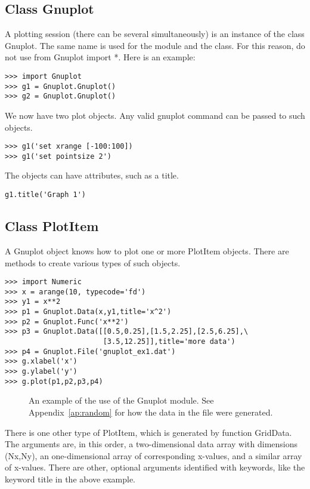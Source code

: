 \documentclass{article}
\begin{document}
\subsection{Class {\ttfamily Gnuplot}}

A plotting session (there can be several simultaneously) is an instance of the
class {\ttfamily Gnuplot}.  The same name is used for the module and the class.
For this reason, do not use {\ttfamily from Gnuplot import *}.
Here is an example:
\begin{verbatim}
>>> import Gnuplot
>>> g1 = Gnuplot.Gnuplot()
>>> g2 = Gnuplot.Gnuplot()
\end{verbatim}
We now have two plot objects.  Any valid {\ttfamily gnuplot} command can be passed
to such objects.
\begin{verbatim}
>>> g1('set xrange [-100:100])
>>> g1('set pointsize 2')
\end{verbatim}
The objects can have attributes, such as a title.
\begin{verbatim}
g1.title('Graph 1')
\end{verbatim}

\subsection{Class {\ttfamily PlotItem}}

A {\ttfamily Gnuplot} object knows how to plot one or more
{\ttfamily PlotItem} objects.
There are methods to create various types of such objects.
\begin{verbatim}
>>> import Numeric
>>> x = arange(10, typecode='fd')
>>> y1 = x**2
>>> p1 = Gnuplot.Data(x,y1,title='x^2')
>>> p2 = Gnuplot.Func('x**2')
>>> p3 = Gnuplot.Data([[0.5,0.25],[1.5,2.25],[2.5,6.25],\
                       [3.5,12.25]],title='more data')
>>> p4 = Gnuplot.File('gnuplot_ex1.dat')
>>> g.xlabel('x')
>>> g.ylabel('y')
>>> g.plot(p1,p2,p3,p4)
\end{verbatim}
\begin{figure}[h!tb]
\begin{center}
\caption{\label{fig:gnuplot1}An example of the use of the {\ttfamily Gnuplot}
module.  See Appendix~\ref{ap:random} for how the data in the file were generated.}
\end{center}
\end{figure}

There is one other type of {\ttfamily PlotItem}, which is generated by
function {\ttfamily GridData}. The arguments are, in this order, a two-dimensional
data array with dimensions ({\ttfamily Nx,Ny}), an one-dimensional array
of corresponding {\ttfamily x}-values, and a similar array of {\ttfamily x}-values.
There are other, optional arguments identified with keywords, like the keyword
{\ttfamily title} in the above example.
\end{document}
